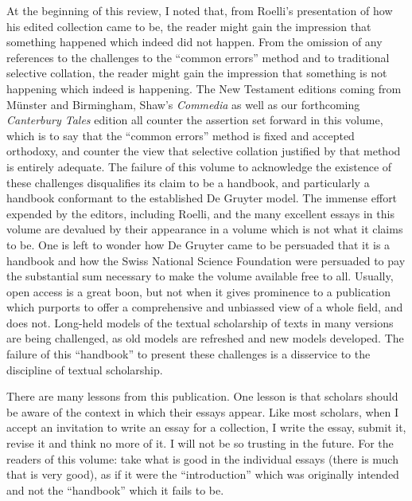 \documentclass{article}
\begin{document}
At the beginning of this review, I noted that, from Roelli's
presentation of how his edited collection came to be, the reader might
gain the impression that something happened which indeed did not happen.
From the omission of any references to the challenges to the ``common
errors'' method and to traditional selective collation, the reader might
gain the impression that something is not happening which indeed is
happening. The New Testament editions coming from Münster and
Birmingham, Shaw's \emph{Commedia} as well as our forthcoming
\emph{Canterbury Tales} edition all counter the assertion set forward in
this volume, which is to say that the ``common errors'' method is fixed
and accepted orthodoxy, and counter the view that selective collation
justified by that method is entirely adequate. The failure of this
volume to acknowledge the existence of these challenges disqualifies its
claim to be a handbook, and particularly a handbook conformant to the
established De Gruyter model. The immense effort expended by the
editors, including Roelli, and the many excellent essays in this volume
are devalued by their appearance in a volume which is not what it claims
to be. One is left to wonder how De Gruyter came to be persuaded that it
is a handbook and how the Swiss National Science Foundation were
persuaded to pay the substantial sum necessary to make the volume
available free to all. Usually, open access is a great boon, but not
when it gives prominence to a publication which purports to offer a
comprehensive and unbiassed view of a whole field, and does not.
Long-held models of the textual scholarship of texts in many versions
are being challenged, as old models are refreshed and new models
developed. The failure of this ``handbook'' to present these challenges
is a disservice to the discipline of textual scholarship.

There are many lessons from this publication. One lesson is
that scholars should be aware of the context in which their essays
appear. Like most scholars, when I accept an invitation to write an
essay for a collection, I write the essay, submit it, revise it and
think no more of it. I will not be so trusting in the future. For the
readers of this volume: take what is good in the individual essays
(there is much that is very good), as if it were the ``introduction''
which was originally intended and not the ``handbook'' which it fails to
be.


\begin{flushleft}
    \renewcommand*{\mkbibnamefamily}[1]{\textsc{#1}}
    \renewcommand*{\mkbibnamegiven}[1]{\textsc{#1}} 
\printbibliography
\end{flushleft}
\end{document}
